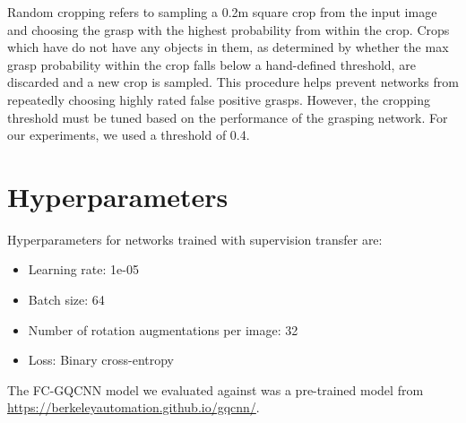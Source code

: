 \begin{appendices}

\noindent Random cropping refers to sampling a 0.2m square crop from the input image and choosing the grasp with the highest probability from within the crop. Crops which have do not have any objects in them, as determined by whether the max grasp probability within the crop falls below a hand-defined threshold, are discarded and a new crop is sampled. This procedure helps prevent networks from repeatedly choosing highly rated false positive grasps. However, the cropping threshold must be tuned based on the performance of the grasping network.  For our experiments, we used a threshold of 0.4.

\pagebreak
\section{Hyperparameters}
\label{appendix:hyperparams}

\noindent Hyperparameters for networks trained with supervision transfer are:

\begin{itemize}
    \item Learning rate: 1e-05
    \item Batch size: 64
    \item Number of rotation augmentations per image: 32
    \item Loss: Binary cross-entropy
\end{itemize}

\noindent The FC-GQCNN model we evaluated against was a pre-trained model from \url{https://berkeleyautomation.github.io/gqcnn/}.

% 
% 
\end{appendices}

% 